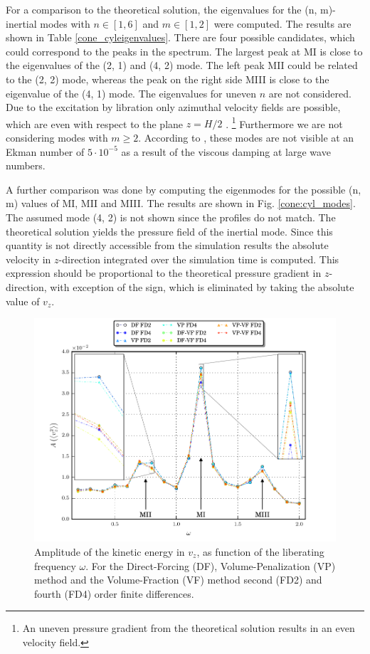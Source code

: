 For a comparison to the theoretical solution, the eigenvalues for the (n, m)-inertial modes with $n\in[1,6]$ and $m\in[1, 2]$ were computed.
The results are shown in Table \ref{cone_cyleigenvalues}.
There are four possible candidates,  which could correspond to the peaks in the spectrum.
The largest peak at M\RN{1} is close to the eigenvalues of the (2, 1) and (4, 2) mode.
The left peak  M\RN{2} could be related to the (2, 2) mode,  whereas the peak on the right side M\RN{3} is close to the eigenvalue of the (4, 1) mode.
The eigenvalues for uneven $n$ are not considered. Due to the excitation by libration only azimuthal velocity fields are possible, which are even
with respect to the plane $z=H/2$ \citep{Sauret2012}.
\footnote{An uneven pressure gradient from the theoretical solution results in an even velocity field.}
Furthermore we are not considering modes with $m\geq2$.
According to \citep{Sauret2012}, these modes are not visible at an Ekman number of $5\cdot10^{-5}$ as a
result of the viscous damping at large wave numbers.

A further comparison was done by computing the eigenmodes for the possible (n, m) values of M\RN{1}, M\RN{2} and M\RN{3}.
The results are shown in Fig. \ref{cone:cyl_modes}.
The assumed mode (4, 2) is not shown since the profiles do not match.
The theoretical solution yields the pressure field of the inertial mode.
Since this quantity is not directly accessible from the simulation results
the absolute velocity in $z$-direction integrated over the simulation time is computed.
This expression should be proportional to the theoretical pressure gradient in $z$-direction,
with exception of the sign, which is eliminated by taking the absolute value of $v_z$.
\clearpage
\begin{figure}[!t]
  \centering
  \includegraphics{gfx/cone/cylinder/cylinder.pdf}  \caption{\label{fig:cone:cyl}
    Amplitude of the kinetic energy in $v_z$, as function of the liberating frequency $\omega$.
   For the Direct-Forcing (DF), Volume-Penalization (VP) method and the Volume-Fraction (VF) method
      second (FD2)  and fourth (FD4) order finite differences.}
\end{figure}

